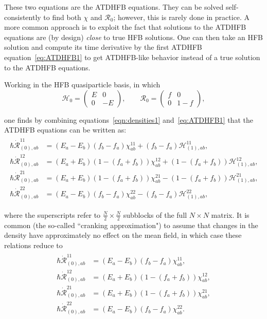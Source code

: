 \noindent These two equations are the ATDHFB equations. They can be solved self-consistently to find both $\chi$ and $\mathcal{R}_0$; however, this is rarely done in practice. A more common approach is to exploit the fact that solutions to the ATDHFB equations are (by design) \textit{close} to true HFB solutions. One can then take an HFB solution and compute its time derivative by the first ATDHFB equation~\eqref{eq:ATDHFB1} to get ATDHFB-like behavior instead of a true solution to the ATDHFB equations.

Working in the HFB quasiparticle basis, in which
\begin{equation}
\mathcal{H}_0 =
\left(\begin{array}{cc}
E & 0 \\
0 & -E
\end{array}\right),
\qquad
\mathcal{R}_0 =
\left(\begin{array}{cc}
f & 0 \\
0 & 1-f
\end{array}\right),
\end{equation}

\noindent one finds by combining equations~\eqref{eqn:densities1} and~\eqref{eq:ATDHFB1} that the ATDHFB equations can be written as:
\begin{align}\label{eqn:chi-rdot_uncranked}
\begin{aligned}
\hbar \dot{\mathcal{R}}_{(0),ab}^{11} &= (E_a-E_b)(f_b-f_a)\chi_{ab}^{11} + (f_b-f_a)\mathcal{H}^{11}_{(1),ab}, \\
\hbar \dot{\mathcal{R}}_{(0),ab}^{12} &= (E_a+E_b)\left(1-(f_a+f_b)\right)\chi_{ab}^{12} + \left(1-(f_a+f_b)\right)\mathcal{H}^{12}_{(1),ab}, \\
\hbar \dot{\mathcal{R}}_{(0),ab}^{21} &= (E_a+E_b)\left(1-(f_a+f_b)\right)\chi_{ab}^{21} - \left(1-(f_a+f_b)\right)\mathcal{H}^{21}_{(1),ab}, \\
\hbar \dot{\mathcal{R}}_{(0),ab}^{22} &= (E_a-E_b)(f_b-f_a)\chi_{ab}^{22} - (f_b-f_a)\mathcal{H}^{22}_{(1),ab},
\end{aligned}
\end{align}

\noindent where the superscripts refer to $\frac{N}{2}\times\frac{N}{2}$ subblocks of the full $N\times N$ matrix. It is common (the so-called ``cranking approximation") to assume that changes in the density have approximately no effect on the mean field, in which case these relations reduce to
\begin{align}\label{eqn:chi-rdot}
\begin{aligned}
\hbar \dot{\mathcal{R}}_{(0),ab}^{11} &= (E_a-E_b)(f_b-f_a)\chi_{ab}^{11}, \\
\hbar \dot{\mathcal{R}}_{(0),ab}^{12} &= (E_a+E_b)\left(1-(f_a+f_b)\right)\chi_{ab}^{12}, \\
\hbar \dot{\mathcal{R}}_{(0),ab}^{21} &= (E_a+E_b)\left(1-(f_a+f_b)\right)\chi_{ab}^{21}, \\
\hbar \dot{\mathcal{R}}_{(0),ab}^{22} &= (E_a-E_b)(f_b-f_a)\chi_{ab}^{22}.
\end{aligned}
\end{align}

